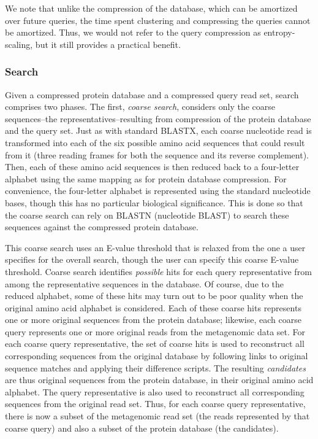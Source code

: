 \documentclass[review,preprint,12pt]{elsarticle}
\theoremstyle{definition}
\theoremstyle{remark}
\numberwithin{equation}{section}
\begin{document}
We note that unlike the compression of the database, which can be amortized 
over future queries, the time spent clustering and compressing the queries 
cannot be amortized.
Thus, we would not refer to the query compression as entropy-scaling, but it
still provides a practical benefit.

\subsubsection*{Search}

Given a compressed protein database and a compressed query read set, search
comprises two phases.
The first, \emph{coarse search}, considers only the coarse sequences--the
representatives--resulting from compression of the protein database and the
query set.
Just as with standard BLASTX, each coarse nucleotide read is transformed into 
each of the six possible amino acid sequences that could result from it (three 
reading frames for both the sequence and its reverse complement).
Then, each of these amino acid sequences is then reduced back to a four-letter
alphabet using the same mapping as for protein database compression.
For convenience, the four-letter alphabet is represented using the standard
nucleotide bases, though this has no particular biological significance.
This is done so that the coarse search can rely on BLASTN (nucleotide BLAST) to
search these sequences against the compressed protein database.

This coarse search uses an E-value threshold that is relaxed from the one a user
specifies for the overall search, though the user can specify this coarse 
E-value threshold.
Coarse search identifies \emph{possible} hits for each query representative from
among the representative sequences in the database.
Of course, due to the reduced alphabet, some of these hits may turn out to be
poor quality when the original amino acid alphabet is considered.
Each of these coarse hits represents one or more original sequences from the
protein database; likewise, each coarse query represents one or more original
reads from the metagenomic data set.
For each coarse query representative, the set of coarse hits is used to
reconstruct all corresponding sequences from the original database by following
links to original sequence matches and applying their difference scripts.
The resulting \emph{candidates} are thus original sequences from the protein
database, in their original amino acid alphabet.
The query representative is also used to reconstruct all corresponding sequences
from the original read set.
Thus, for each coarse query representative, there is now a subset of the
metagenomic read set (the reads represented by that coarse query) and also a
subset of the protein database (the candidates).
\end{document}
